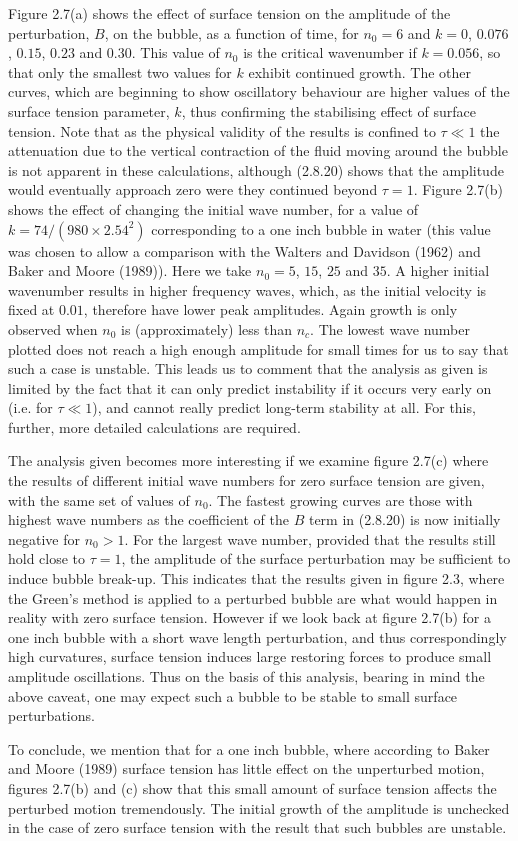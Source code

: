 Figure 2.7(a) shows the effect of surface tension on the amplitude
of the perturbation, $B$, on the bubble, as a function of time,
for $n_0=6$ and $k=0$, $0.076$, $0.15$, $0.23$ and $0.30$.
This value of $n_0$ is the critical wavenumber if $k=0.056$, so that only 
the smallest two values for $k$ exhibit continued growth.
The other curves, which are beginning to show oscillatory behaviour
are higher values of the surface tension parameter, $k$,
thus confirming the stabilising effect of surface tension.
Note that as the physical validity of the results is confined to
$\tau\ll 1$ the attenuation due to the vertical contraction of the
fluid moving around the bubble is not apparent in these calculations,
although (2.8.20) shows that the amplitude would eventually approach zero
were they continued beyond $\tau=1$.
Figure 2.7(b) shows the effect of  changing  the 
initial wave number, for a value of $k=74/(980\times 2.54^2)$ corresponding to
a one inch bubble in water (this value was chosen to allow
a comparison with the Walters and Davidson (1962) and Baker and Moore (1989)).
Here we take $n_0=5$, $15$, $25$ and $35$.
A higher initial  wavenumber  results  in
higher frequency waves, which, as the initial velocity
is fixed at $0.01$, therefore have lower peak amplitudes.
Again growth is only observed when $n_0$ is (approximately)
less than $n_c$.
The lowest wave number plotted does not reach a
high enough amplitude for small times for us to say that
such a case is unstable.
This leads us to comment that
the analysis as given is limited by the 
fact that it can only predict instability if it occurs very
early on (i.e. for $\tau\ll 1$), and cannot really predict long-term
stability at all. For this, further, more detailed calculations
are required.

The analysis given becomes more interesting if we
examine figure 2.7(c) where the results of different initial wave 
numbers for zero surface tension are given,
with the same set of values of $n_0$.  The  fastest  growing 
curves are those with  highest  wave  numbers
as the coefficient of the $B$ term in (2.8.20) is now
initially negative for $n_0>1$.  For  
the largest wave  number, provided that the results still
hold close to $\tau=1$, the amplitude of the  surface  perturbation
may be sufficient to induce bubble break-up. This indicates that 
the results given in figure 2.3, where the Green's method  is  applied 
to a perturbed bubble are what would happen in reality
with zero surface tension.
However if we look back at figure 2.7(b) for a one
inch bubble with a short wave length perturbation, and thus 
correspondingly high curvatures, surface tension induces large
restoring forces to produce
small amplitude oscillations. Thus on the basis of this  analysis,
bearing in mind the above caveat, one may expect such a bubble
to be stable to small surface perturbations.

To conclude, we mention that for
a one inch bubble, where according to Baker and Moore (1989) surface tension
has little effect on the unperturbed motion,  figures  2.7(b)  and 
(c) show that this small amount of  surface  tension  affects  the 
perturbed motion tremendously.
The initial growth of the amplitude is unchecked in the case of  zero 
surface tension with the result that such bubbles are unstable.
